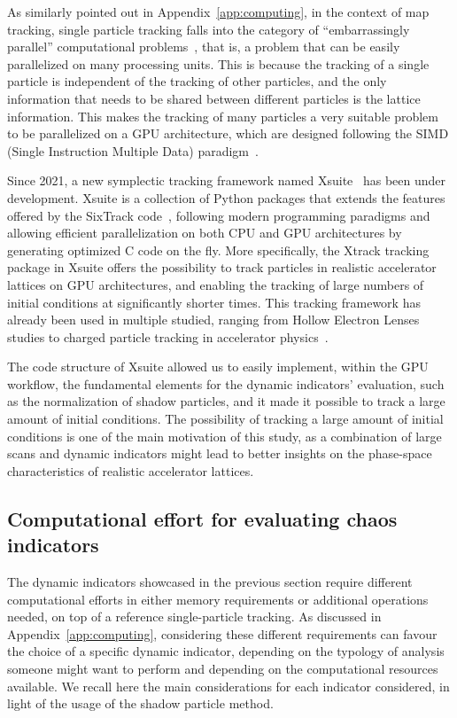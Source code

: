 As similarly pointed out in Appendix~\ref{app:computing}, in the context of map tracking, single particle tracking falls into the category of ``embarrassingly parallel'' computational problems~\cite{Giovannozzi:317866}, that is, a problem that can be easily parallelized on many processing units. This is because the tracking of a single particle is independent of the tracking of other particles, and the only information that needs to be shared between different particles is the lattice information. This makes the tracking of many particles a very suitable problem to be parallelized on a GPU architecture, which are designed following the SIMD (Single Instruction Multiple Data) paradigm~\cite{DBLP:journals/corr/abs-1202-4347}.

Since 2021, a new symplectic tracking framework named Xsuite~\cite{xsuite} has been under development. Xsuite is a collection of Python packages that extends the features offered by the SixTrack code~\cite{De_Maria_2019}, following modern programming paradigms and allowing efficient parallelization on both CPU and GPU architectures by generating optimized C code on the fly. More specifically, the Xtrack tracking package in Xsuite offers the possibility to track particles in realistic accelerator lattices on GPU architectures, and enabling the tracking of large numbers of initial conditions at significantly shorter times. This tracking framework has already been used in multiple studied, ranging from Hollow Electron Lenses studies to charged particle tracking in accelerator physics~\cite{pang2014gpu,oeftiger:hb16-mopr025,adelmann2019opal,schwinzerl:ipac21-thpab190,hermes:ipac2022-mopost045,iliakis2022enabling}.

The code structure of Xsuite allowed us to easily implement, within the GPU workflow, the fundamental elements for the dynamic indicators' evaluation, such as the normalization of shadow particles, and it made it possible to track a large amount of initial conditions. The possibility of tracking a large amount of initial conditions is one of the main motivation of this study, as a combination of large scans and dynamic indicators might lead to better insights on the phase-space characteristics of realistic accelerator lattices.
%
\subsection{Computational effort for evaluating chaos indicators}

The dynamic indicators showcased in the previous section require different computational efforts in either memory requirements or additional operations needed, on top of a reference single-particle tracking. As discussed in Appendix~\ref{app:computing}, considering these different requirements can favour the choice of a specific dynamic indicator, depending on the typology of analysis someone might want to perform and depending on the computational resources available. We recall here the main considerations for each indicator considered, in light of the usage of the shadow particle method.

